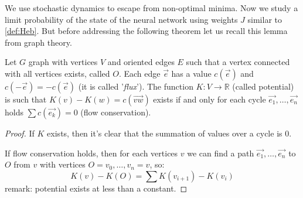 \noindent We use stochastic dynamics to escape from non-optimal minima. Now we study a limit probability of the state of the neural network using weights $J$ similar to  \cref{def:Heb}. But before addressing the following theorem let us recall this lemma from graph theory.
\begin{lemma}
    \label{lemma:combinatorics}
    Let $G$ graph with vertices $V$ and oriented edges $E$ such that a vertex connected with all vertices exists, called $O$. Each edge $\vec{e}$ has a value $c(\vec{e})$ and $c(-\vec{e}) = -c(\vec{e})$ (it is called '\textit{flux}'). The function $K:V\to\mathbb{R}$ (called potential) is such that $K(v)-K(w)=c(\vec{vw})$ exists if and only for each cycle $\vec{e_1},\ldots,\vec{e_n}$ holds $\sum c(\vec{e_k}) = 0$ (flow conservation).

    \begin{proof}
        If $K$ exists, then it's clear that the summation of values over a cycle is $0$.

        \noindent If flow conservation holds, then for each vertices $v$ we can find a path $\vec{e_1},\ldots,\vec{e_n}$ to $O$ from $v$ with vertices $O=v_0,\ldots,v_n=v$, so:
        \[
        K(v)-K(O) = \sum K(v_{i+1}) - K(v_{i})
        \]
        remark: potential exists at less than a constant.
    \end{proof}
\end{lemma}

